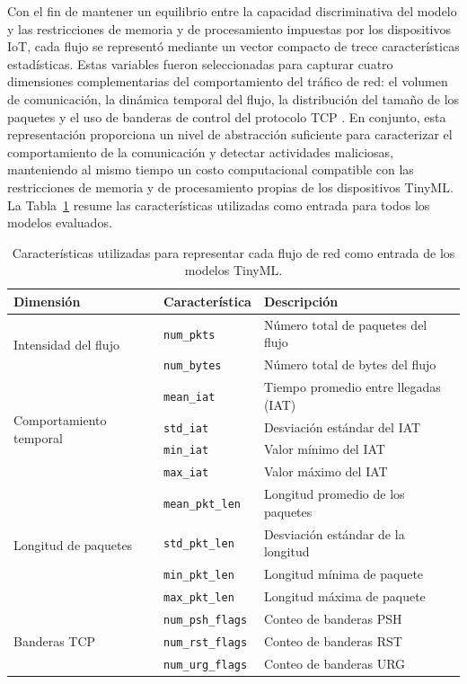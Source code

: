 \documentclass[journal,article,submit,moreauthors]{Definitions/mdpi}
\begin{document}
Con el fin de mantener un equilibrio entre la capacidad discriminativa del modelo y las restricciones de memoria y de procesamiento impuestas por los dispositivos IoT, cada flujo se representó mediante un vector compacto de trece características estadísticas. Estas variables fueron seleccionadas para capturar cuatro dimensiones complementarias del comportamiento del tráfico de red: el volumen de comunicación, la dinámica temporal del flujo, la distribución del tamaño de los paquetes y el uso de banderas de control del protocolo TCP \cite{Zouhri2024,Li2017}. En conjunto, esta representación proporciona un nivel de abstracción suficiente para caracterizar el comportamiento de la comunicación y detectar actividades maliciosas, manteniendo al mismo tiempo un costo computacional compatible con las restricciones de memoria y de procesamiento propias de los dispositivos TinyML. La Tabla~\ref{tab:flow_features} resume las características utilizadas como entrada para todos los modelos evaluados.

\begin{table}[ht]
\centering
\caption{Características utilizadas para representar cada flujo de red como entrada de los modelos TinyML.}
\label{tab:flow_features}
\footnotesize
\begin{tabular}{lll}
\toprule
\textbf{Dimensión} & \textbf{Característica} & \textbf{Descripción} \\
\midrule
\multirow{2}{*}{Intensidad del flujo}
& \texttt{num\_pkts} & Número total de paquetes del flujo \\
& \texttt{num\_bytes} & Número total de bytes del flujo \\
\midrule

\multirow{4}{*}{Comportamiento temporal}
& \texttt{mean\_iat} & Tiempo promedio entre llegadas (IAT) \\
& \texttt{std\_iat} & Desviación estándar del IAT \\
& \texttt{min\_iat} & Valor mínimo del IAT \\
& \texttt{max\_iat} & Valor máximo del IAT \\
\midrule

\multirow{4}{*}{Longitud de paquetes}
& \texttt{mean\_pkt\_len} & Longitud promedio de los paquetes \\
& \texttt{std\_pkt\_len} & Desviación estándar de la longitud \\
& \texttt{min\_pkt\_len} & Longitud mínima de paquete \\
& \texttt{max\_pkt\_len} & Longitud máxima de paquete \\
\midrule

\multirow{3}{*}{Banderas TCP}
& \texttt{num\_psh\_flags} & Conteo de banderas PSH \\
& \texttt{num\_rst\_flags} & Conteo de banderas RST \\
& \texttt{num\_urg\_flags} & Conteo de banderas URG \\
\bottomrule
\end{tabular}
\end{table}
\end{document}
